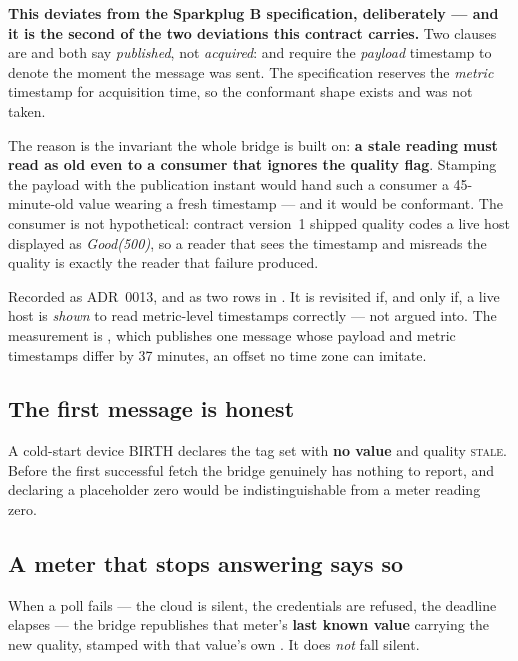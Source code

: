 \begin{warning}
\textbf{This deviates from the Sparkplug B specification, deliberately --- and it is the
second of the two deviations this contract carries.} Two clauses are  and both
say \emph{published}, not \emph{acquired}:  and
 require the \emph{payload} timestamp to denote the
moment the message was sent. The specification reserves the \emph{metric} timestamp for
acquisition time, so the conformant shape exists and was not taken.

The reason is the invariant the whole bridge is built on: \textbf{a stale reading must read
as old even to a consumer that ignores the quality flag}. Stamping the payload with the
publication instant would hand such a consumer a 45-minute-old value wearing a fresh
timestamp --- and it would be conformant. The consumer is not hypothetical: contract
version~1 shipped quality codes a live host displayed as \emph{Good(500)}, so a reader that
sees the timestamp and misreads the quality is exactly the reader that failure produced.

Recorded as ADR~0013, and as two  rows in
. It is revisited if, and only if, a live host is
\emph{shown} to read metric-level timestamps correctly --- not argued into. The measurement
is , which publishes one message whose payload and metric
timestamps differ by 37 minutes, an offset no time zone can imitate.
\end{warning}

\subsection{The first message is honest}

A cold-start device BIRTH declares the tag set with \textbf{no value} and quality
\textsc{stale}. Before the first successful fetch the bridge genuinely has nothing to
report, and declaring a placeholder zero would be indistinguishable from a meter reading
zero.

\subsection{A meter that stops answering says so}

When a poll fails --- the cloud is silent, the credentials are refused, the deadline elapses
--- the bridge republishes that meter's \textbf{last known value} carrying the new quality,
stamped with that value's own . It does \emph{not} fall silent.

